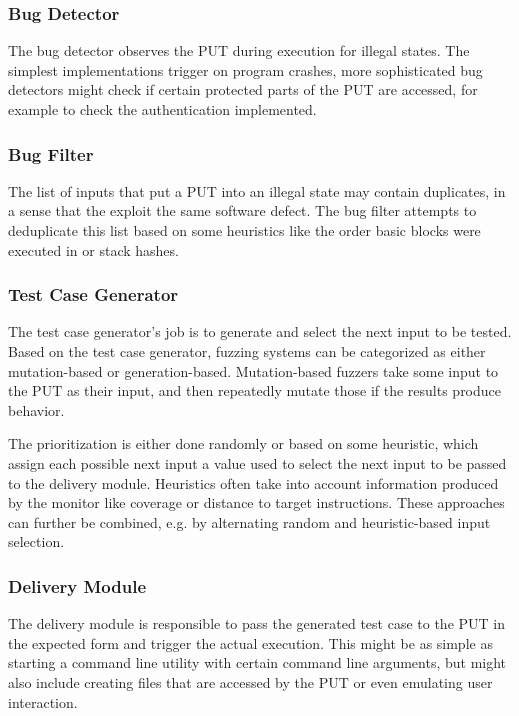 \documentclass{article}
\begin{document}
\begin{multicols}{2}
    \subsubsection{Bug Detector}
    The bug detector observes the PUT during execution for illegal states. The simplest implementations trigger on program crashes, more sophisticated bug detectors might check if certain protected parts of the PUT are accessed, for example to check the authentication implemented.

    \subsubsection{Bug Filter}
    The list of inputs that put a PUT into an illegal state may contain duplicates, in a sense that the exploit the same software defect. The bug filter attempts to deduplicate this list based on some heuristics like the order basic blocks were executed in or stack hashes.

    \subsubsection{Test Case Generator}
    The test case generator's job is to generate and select the next input to be tested. Based on the test case generator, fuzzing systems can be categorized as either mutation-based or generation-based. Mutation-based fuzzers take some input to the PUT as their input, and then repeatedly mutate those if the results produce  behavior\cite{EvaluatingFuzzTesting}.

    The prioritization is either done randomly or based on some heuristic, which assign each possible next input a value used to select the next input to be passed to the delivery module. Heuristics often take into account information produced by the monitor like coverage or distance to target instructions. These approaches can further be combined, e.g. by alternating random and heuristic-based input selection.

    \subsubsection{Delivery Module}
    The delivery module is responsible to pass the generated test case to the PUT in the expected form and trigger the actual execution. This might be as simple as starting a command line utility with certain command line arguments, but might also include creating files that are accessed by the PUT or even emulating user interaction.


\end{multicols}
\end{document}
